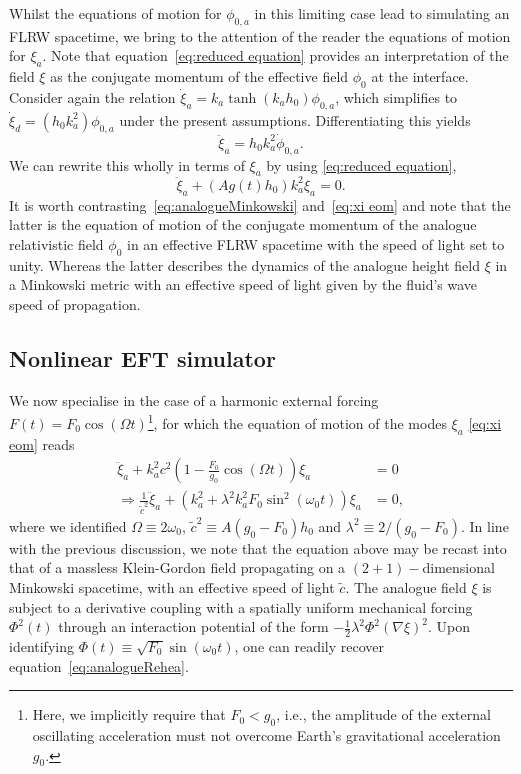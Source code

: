 \documentclass[a4paper]{jpconf}
\begin{document}
Whilst the equations of motion for $\phi_{0,a}$ in this limiting case lead to simulating an FLRW spacetime, we bring to the attention of the reader the equations of motion for $\xi_a$. Note that equation~\eqref{eq:reduced equation} provides an interpretation of the field $\xi$ as the conjugate momentum of the effective field $\phi_0$ at the interface. Consider again the relation $\dot{\xi}_a=k_a\tanh(k_ah_0)\phi_{0,a}$, which simplifies to $\dot{\xi}_d=(h_0k_a^2)\phi_{0,a}$ under the present assumptions. Differentiating this yields
\begin{equation}
    \ddot{\xi}_a=h_0k_a^2\dot{\phi}_{0,a}.
\end{equation} We can rewrite this wholly in terms of $\xi_a$ by using \eqref{eq:reduced equation},
\begin{equation}\label{eq:xi eom}
    \ddot{\xi}_a+(Ag(t)h_0)k_a^2\xi_a=0.
\end{equation}
It is worth contrasting~\eqref{eq:analogueMinkowski} and~\eqref{eq:xi eom} and note that the latter is the equation of motion of the conjugate momentum of the analogue relativistic field $\phi_0$ in an effective FLRW spacetime with the speed of light set to unity. Whereas the latter describes the dynamics of the analogue height field $\xi$ in a Minkowski metric with an effective speed of light given by the fluid's wave speed of propagation. 

\subsection{Nonlinear EFT simulator}
We now specialise in the case of a harmonic external forcing $F(t)=F_0\cos(\Omega t)$\footnote{Here, we implicitly require that $F_0<g_0$, i.e., the amplitude of the external oscillating acceleration must not overcome Earth's gravitational acceleration $g_0$.}, for which the equation of motion of the modes $\xi_a$ \eqref{eq:xi eom} reads
\begin{subequations}
\label{eq:analogueMR}
\begin{align}
    \ddot{\xi}_a+k_a^2c^2\left(1-\frac{F_0}{g_0}\cos(\Omega t)\right)\xi_a&=0\label{eq:mathieu}\\
    \Rightarrow\frac{1}{\tilde{c}^{2}}\ddot{\xi}_a+\left(k_a^2+\lambda^2 k_a^2 F_0 \sin^2(\omega_0 t)\right)\xi_a&=0,\label{eq:analogueRehea}    
\end{align}
\end{subequations}
where we identified $\Omega\equiv 2\omega_0$, $\tilde{c}^2\equiv A(g_0-F_0)h_0$ and $\lambda^2\equiv 2/(g_0-F_0)$. In line with the previous discussion, we note that the equation above may be recast into that of a massless Klein-Gordon field propagating on a $(2+1)-$dimensional Minkowski spacetime, with an effective speed of light $\tilde{c}$. The analogue field $\xi$ is subject to a derivative coupling with a spatially uniform mechanical forcing $\Phi^2(t)$ through an interaction potential of the form $-\tfrac{1}{2}\lambda^2\Phi^2\left(\nabla\xi\right)^2$. Upon identifying $\Phi(t)\equiv\sqrt{F_0}\sin(\omega_0 t)$, one can readily recover equation~\eqref{eq:analogueRehea}.
\end{document}
